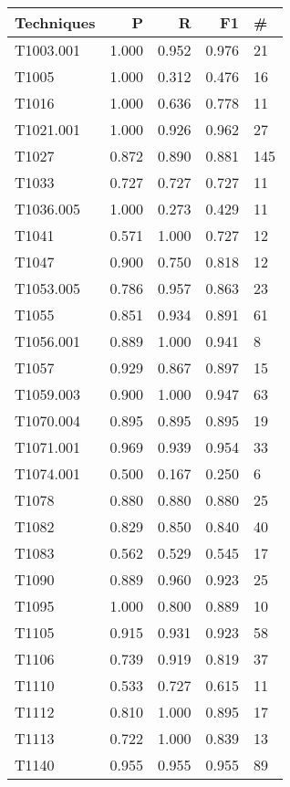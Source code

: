\begin{tabular}{lrrrl}
    \toprule
    Techniques & P     & R     & F1    & \#  \\
    \midrule
    T1003.001  & 1.000 & 0.952 & 0.976 & 21  \\
    T1005      & 1.000 & 0.312 & 0.476 & 16  \\
    T1016      & 1.000 & 0.636 & 0.778 & 11  \\
    T1021.001  & 1.000 & 0.926 & 0.962 & 27  \\
    T1027      & 0.872 & 0.890 & 0.881 & 145 \\
    T1033      & 0.727 & 0.727 & 0.727 & 11  \\
    T1036.005  & 1.000 & 0.273 & 0.429 & 11  \\
    T1041      & 0.571 & 1.000 & 0.727 & 12  \\
    T1047      & 0.900 & 0.750 & 0.818 & 12  \\
    T1053.005  & 0.786 & 0.957 & 0.863 & 23  \\
    T1055      & 0.851 & 0.934 & 0.891 & 61  \\
    T1056.001  & 0.889 & 1.000 & 0.941 & 8   \\
    T1057      & 0.929 & 0.867 & 0.897 & 15  \\
    T1059.003  & 0.900 & 1.000 & 0.947 & 63  \\
    T1070.004  & 0.895 & 0.895 & 0.895 & 19  \\
    T1071.001  & 0.969 & 0.939 & 0.954 & 33  \\
    T1074.001  & 0.500 & 0.167 & 0.250 & 6   \\
    T1078      & 0.880 & 0.880 & 0.880 & 25  \\
    T1082      & 0.829 & 0.850 & 0.840 & 40  \\
    T1083      & 0.562 & 0.529 & 0.545 & 17  \\
    T1090      & 0.889 & 0.960 & 0.923 & 25  \\
    T1095      & 1.000 & 0.800 & 0.889 & 10  \\
    T1105      & 0.915 & 0.931 & 0.923 & 58  \\
    T1106      & 0.739 & 0.919 & 0.819 & 37  \\
    T1110      & 0.533 & 0.727 & 0.615 & 11  \\
    T1112      & 0.810 & 1.000 & 0.895 & 17  \\
    T1113      & 0.722 & 1.000 & 0.839 & 13  \\
    T1140      & 0.955 & 0.955 & 0.955 & 89  \\

\end{tabular}
